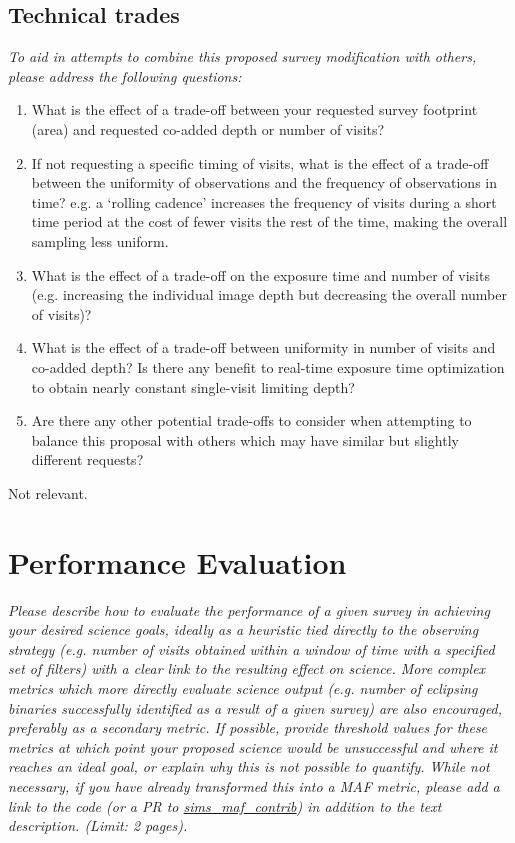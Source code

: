 \documentclass[12pt, letterpaper]{article}
\begin{document}
\subsection{Technical trades}
\begin{footnotesize}
{\it To aid in attempts to combine this proposed survey modification with others, please address the following questions:
\begin{enumerate}
    \item What is the effect of a trade-off between your requested survey footprint (area) and requested co-added depth or number of visits?
    \item If not requesting a specific timing of visits, what is the effect of a trade-off between the uniformity of observations and the frequency of observations in time? e.g. a `rolling cadence' increases the frequency of visits during a short time period at the cost of fewer visits the rest of the time, making the overall sampling less uniform.
    \item What is the effect of a trade-off on the exposure time and number of visits (e.g. increasing the individual image depth but decreasing the overall number of visits)?
    \item What is the effect of a trade-off between uniformity in number of visits and co-added depth? Is there any benefit to real-time exposure time optimization to obtain nearly constant single-visit limiting depth?
    \item Are there any other potential trade-offs to consider when attempting to balance this proposal with others which may have similar but slightly different requests?
\end{enumerate}}
\end{footnotesize}

Not relevant.

\section{Performance Evaluation}
\begin{footnotesize}
{\it Please describe how to evaluate the performance of a given survey in achieving your desired
science goals, ideally as a heuristic tied directly to the observing strategy (e.g. number of visits obtained
within a window of time with a specified set of filters) with a clear link to the resulting effect on science.
More complex metrics which more directly evaluate science output (e.g. number of eclipsing binaries successfully
identified as a result of a given survey) are also encouraged, preferably as a secondary metric.
If possible, provide threshold values for these metrics at which point your proposed science would be unsuccessful 
and where it reaches an ideal goal, or explain why this is not possible to quantify. While not necessary, 
if you have already transformed this into a MAF metric, please add a link to the code (or a PR to 
\href{https://github.com/lsst-nonproject/sims_maf_contrib}{sims\_maf\_contrib}) in addition to the text description. (Limit: 2 pages).}
\end{footnotesize}
\end{document}
